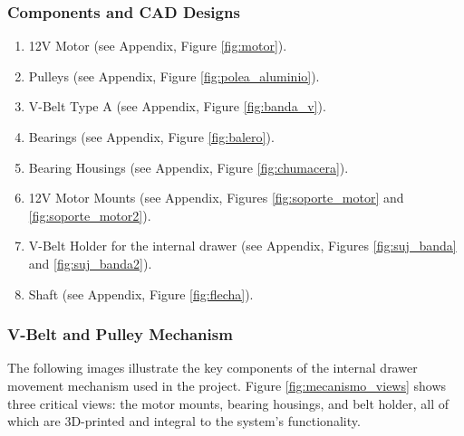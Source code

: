 \subsubsection{Components and CAD Designs}
    \begin{enumerate}
        \item 12V Motor (see Appendix, Figure \ref{fig:motor}).
            
        \item Pulleys (see Appendix, Figure \ref{fig:polea_aluminio}).
    
        \item V-Belt Type A (see Appendix, Figure \ref{fig:banda_v}).
        
        \item Bearings (see Appendix, Figure \ref{fig:balero}).

        \item Bearing Housings (see Appendix, Figure \ref{fig:chumacera}).
        
        \item 12V Motor Mounts (see Appendix, Figures \ref{fig:soporte_motor} and \ref{fig:soporte_motor2}).
        
        \item V-Belt Holder for the internal drawer (see Appendix, Figures \ref{fig:suj_banda} and \ref{fig:suj_banda2}).
        
        \item Shaft (see Appendix, Figure \ref{fig:flecha}).
            
    \end{enumerate}

\subsubsection{V-Belt and Pulley Mechanism}


The following images illustrate the key components of the internal drawer movement mechanism used in the project. Figure \ref{fig:mecanismo_views} shows three critical views: the motor mounts, bearing housings, and belt holder, all of which are 3D-printed and integral to the system's functionality.

